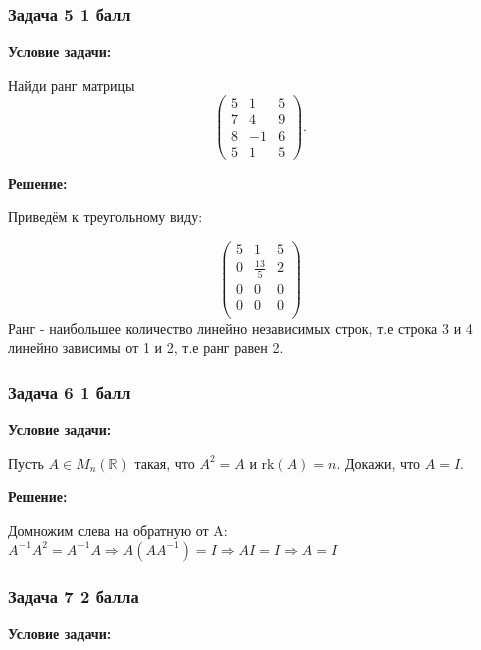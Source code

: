 \documentclass[a4paper,12pt]{article}
\begin{document}
\subsubsection{Задача 5 \hfill 1 балл}
\textbf{Условие задачи:}

Найди ранг матрицы
\[
\begin{pmatrix}
5 & 1 & 5 \\
7 & 4 & 9 \\
8 & -1 & 6 \\
5 & 1 & 5
\end{pmatrix}.
\]

\textbf{Решение:}

Приведём к треугольному виду:

\[
\begin{pmatrix}
5 & 1 & 5 \\
0 & \frac{13}{5} & 2 \\
0 & 0 & 0 \\
0 & 0 & 0 \\
\end{pmatrix}
\]
Ранг - наибольшее количество линейно независимых строк, т.е строка 3 и 4 линейно зависимы от 1 и 2, т.е ранг равен 2. 

\subsubsection{Задача 6 \hfill 1 балл}
\textbf{Условие задачи:}

Пусть \( A \in M_n(\mathbb{R}) \) такая, что \( A^2 = A \) и \( \text{rk}(A) = n \). Докажи, что \( A = I \).

\textbf{Решение:}

Домножим слева на обратную от A: $A^{-1}A^2=A^{-1}A\Rightarrow  A(AA^{-1})=I \Rightarrow AI=I \Rightarrow A=I$

\subsubsection{Задача 7 \hfill 2 балла}
\textbf{Условие задачи:}
\end{document}
